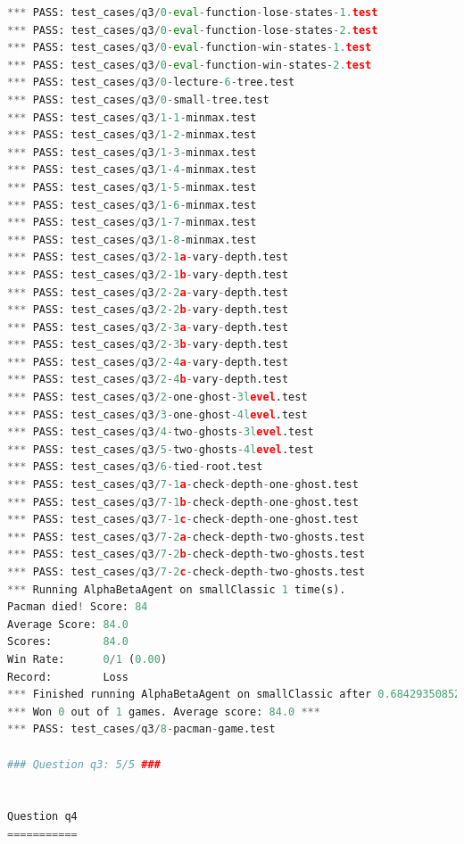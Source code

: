 \documentclass{report}
\begin{document}
\begin{lstlisting}[language=Python, caption=Resultados del Autograder]
*** PASS: test_cases/q3/0-eval-function-lose-states-1.test
*** PASS: test_cases/q3/0-eval-function-lose-states-2.test
*** PASS: test_cases/q3/0-eval-function-win-states-1.test
*** PASS: test_cases/q3/0-eval-function-win-states-2.test
*** PASS: test_cases/q3/0-lecture-6-tree.test
*** PASS: test_cases/q3/0-small-tree.test
*** PASS: test_cases/q3/1-1-minmax.test
*** PASS: test_cases/q3/1-2-minmax.test
*** PASS: test_cases/q3/1-3-minmax.test
*** PASS: test_cases/q3/1-4-minmax.test
*** PASS: test_cases/q3/1-5-minmax.test
*** PASS: test_cases/q3/1-6-minmax.test
*** PASS: test_cases/q3/1-7-minmax.test
*** PASS: test_cases/q3/1-8-minmax.test
*** PASS: test_cases/q3/2-1a-vary-depth.test
*** PASS: test_cases/q3/2-1b-vary-depth.test
*** PASS: test_cases/q3/2-2a-vary-depth.test
*** PASS: test_cases/q3/2-2b-vary-depth.test
*** PASS: test_cases/q3/2-3a-vary-depth.test
*** PASS: test_cases/q3/2-3b-vary-depth.test
*** PASS: test_cases/q3/2-4a-vary-depth.test
*** PASS: test_cases/q3/2-4b-vary-depth.test
*** PASS: test_cases/q3/2-one-ghost-3level.test
*** PASS: test_cases/q3/3-one-ghost-4level.test
*** PASS: test_cases/q3/4-two-ghosts-3level.test
*** PASS: test_cases/q3/5-two-ghosts-4level.test
*** PASS: test_cases/q3/6-tied-root.test
*** PASS: test_cases/q3/7-1a-check-depth-one-ghost.test
*** PASS: test_cases/q3/7-1b-check-depth-one-ghost.test
*** PASS: test_cases/q3/7-1c-check-depth-one-ghost.test
*** PASS: test_cases/q3/7-2a-check-depth-two-ghosts.test
*** PASS: test_cases/q3/7-2b-check-depth-two-ghosts.test
*** PASS: test_cases/q3/7-2c-check-depth-two-ghosts.test
*** Running AlphaBetaAgent on smallClassic 1 time(s).
Pacman died! Score: 84
Average Score: 84.0
Scores:        84.0
Win Rate:      0/1 (0.00)
Record:        Loss
*** Finished running AlphaBetaAgent on smallClassic after 0.6842935085296631 seconds.
*** Won 0 out of 1 games. Average score: 84.0 ***
*** PASS: test_cases/q3/8-pacman-game.test

### Question q3: 5/5 ###


Question q4
===========


\end{lstlisting}
\end{document}
